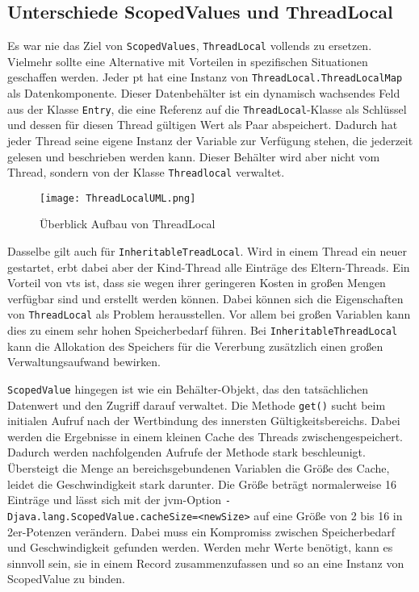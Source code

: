 \subsection{Unterschiede ScopedValues und ThreadLocal}
\label{subsec:UnterschiedeScopedValuesundThreadLocal}

    Es war nie das Ziel von \texttt{ScopedValues}, \texttt{ThreadLocal} vollends zu ersetzen. Vielmehr sollte eine Alternative mit Vorteilen in spezifischen Situationen geschaffen werden.
    Jeder \gls{pt} hat eine Instanz von \texttt{ThreadLocal.ThreadLocalMap} als Datenkomponente. Dieser Datenbehälter ist ein dynamisch wachsendes Feld aus
    der Klasse \texttt{Entry}, die eine Referenz auf die \texttt{ThreadLocal}-Klasse als Schlüssel
    und dessen für diesen Thread gültigen Wert als Paar abspeichert. Dadurch hat jeder Thread seine eigene Instanz der Variable zur Verfügung stehen, die jederzeit gelesen und beschrieben werden kann.
    Dieser Behälter wird aber nicht vom Thread, sondern von der Klasse \texttt{Threadlocal} verwaltet. 
    \begin{figure}[H]
        \centering
        \texttt{[image: ThreadLocalUML.png]}
        \caption{Überblick Aufbau von ThreadLocal}
        \label{fig:ThreadLocalMap}
    \end{figure}
    Dasselbe gilt auch für \texttt{InheritableTreadLocal}. Wird in einem Thread ein neuer gestartet, erbt dabei aber der Kind-Thread alle Einträge des Eltern-Threads. 
    Ein Vorteil von \Glspl{vt} ist, dass sie wegen ihrer geringeren Kosten in großen Mengen verfügbar sind und erstellt werden können. Dabei können sich die Eigenschaften von \texttt{ThreadLocal}
    als Problem herausstellen. Vor allem bei großen Variablen kann dies zu einem sehr hohen Speicherbedarf führen. Bei \texttt{InheritableThreadLocal} kann die Allokation des Speichers
    für die Vererbung zusätzlich einen großen Verwaltungsaufwand bewirken. 

    \texttt{ScopedValue} hingegen ist wie ein Behälter-Objekt, das den tatsächlichen Datenwert und den Zugriff darauf verwaltet. Die Methode \texttt{get()} sucht beim initialen Aufruf nach
    der Wertbindung des innersten Gültigkeitsbereichs. Dabei werden die Ergebnisse in einem kleinen Cache des Threads zwischengespeichert. Dadurch werden nachfolgenden Aufrufe der
    Methode stark beschleunigt. Übersteigt die Menge an bereichsgebundenen Variablen die Größe des Cache, leidet die Geschwindigkeit stark darunter. Die Größe beträgt normalerweise 16 Einträge
    und lässt sich mit der \gls{jvm}-Option \texttt{-Djava.lang.ScopedValue.cacheSize=<newSize>} auf eine Größe von 2 bis 16 in 2er-Potenzen verändern. Dabei muss ein Kompromiss
    zwischen Speicherbedarf und Geschwindigkeit gefunden werden. Werden mehr Werte benötigt, kann es sinnvoll sein, sie in einem Record zusammenzufassen und so an eine Instanz von ScopedValue
    zu binden. 

